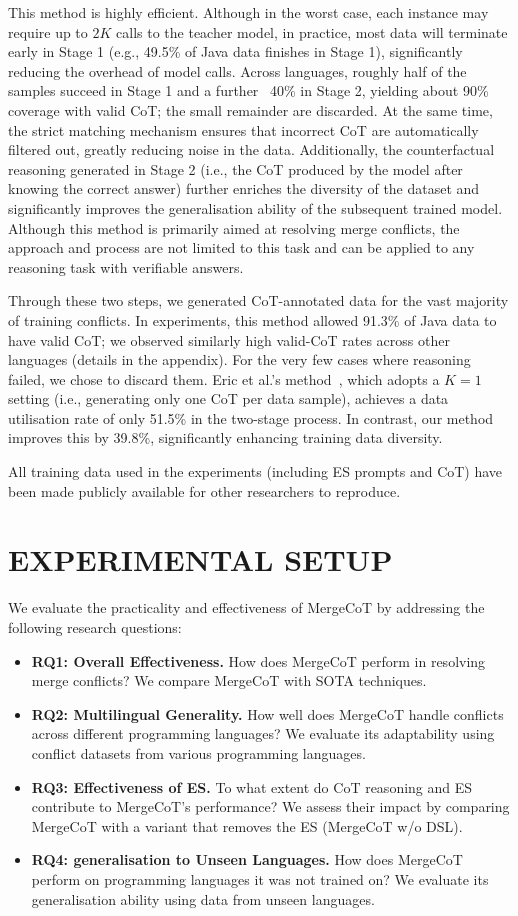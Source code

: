 \documentclass[sigconf,review,anonymous]{acmart}
\begin{document}
This method is highly efficient. Although in the worst case, each instance may require up to $2K$ calls to the teacher model, in practice, most data will terminate early in Stage 1 (e.g., 49.5\% of Java data finishes in Stage 1), significantly reducing the overhead of model calls. Across languages, roughly half of the samples succeed in Stage 1 and a further ~40\% in Stage 2, yielding about 90\% coverage with valid CoT; the small remainder are discarded. At the same time, the strict matching mechanism ensures that incorrect CoT are automatically filtered out, greatly reducing noise in the data. 
Additionally, the counterfactual reasoning generated in Stage 2 (i.e., the CoT produced by the model after knowing the correct answer) further enriches the diversity of the dataset and significantly improves the generalisation ability of the subsequent trained model. 
Although this method is primarily aimed at resolving merge conflicts, the approach and process are not limited to this task and can be applied to any reasoning task with verifiable answers.

Through these two steps, we generated CoT-annotated data for the vast majority of training conflicts. In experiments, this method allowed 91.3\% of Java data to have valid CoT; we observed similarly high valid-CoT rates across other languages (details in the appendix). For the very few cases where reasoning failed, we chose to discard them. Eric et al.’s method~\cite{star}, which adopts a $K=1$ setting (i.e., generating only one CoT per data sample), achieves a data utilisation rate of only 51.5\% in the two-stage process. In contrast, our method improves this by 39.8\%, significantly enhancing training data diversity.

All training data used in the experiments (including ES prompts and CoT) have been made publicly available for other researchers to reproduce.


\section{EXPERIMENTAL SETUP}

We evaluate the practicality and effectiveness of MergeCoT by addressing the following research questions:
\begin{itemize}
    \item \textbf{RQ1: Overall Effectiveness.} How does MergeCoT perform in resolving merge conflicts? We compare MergeCoT with SOTA techniques.
    \item \textbf{RQ2: Multilingual Generality.} How well does MergeCoT handle conflicts across different programming languages? We evaluate its adaptability using conflict datasets from various programming languages.
    \item \textbf{RQ3: Effectiveness of ES.} To what extent do CoT reasoning and ES contribute to MergeCoT’s performance? We assess their impact by comparing MergeCoT with a variant that removes the ES (MergeCoT w/o DSL).
    \item \textbf{RQ4: generalisation to Unseen Languages.} How does MergeCoT perform on programming languages it was not trained on? We evaluate its generalisation ability using data from unseen languages.
\end{itemize}
\end{document}
